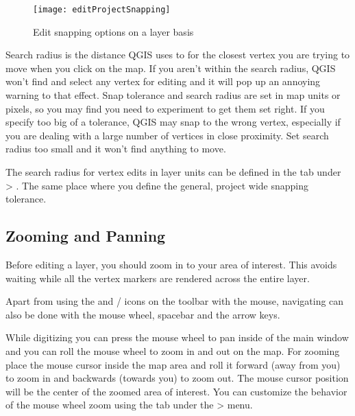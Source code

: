 \begin{figure}[H]
   \begin{center}
   \caption{Edit snapping options on a layer basis \nixcaption}\label{fig:snappingoptions}\smallskip
   \texttt{[image: editProjectSnapping]} 
\end{center}  
\end{figure}


Search radius is the distance QGIS uses to  for the closest
vertex you are trying to move when you click on the
map. If you aren't within the search radius, QGIS won't find and select
any vertex for editing and it will pop up an annoying warning to that effect.
Snap tolerance and search radius are set in map units or pixels, so you may find you
need to experiment to get them set right. If you specify too big of a
tolerance, QGIS may snap to the wrong vertex, especially if you are dealing
with a large number of vertices in close proximity. Set search radius too
small and it won't find anything to move.

The search radius for vertex edits in layer units can be defined in the
 tab under  >
. The same place where you define the
general, project wide snapping tolerance.

\subsection{Zooming and Panning}

Before editing a layer, you should zoom in to your area of interest. This
avoids waiting while all the vertex markers are rendered across the entire
layer.

Apart from using the  and
/
icons on the toolbar with the mouse, navigating can also be done with the
mouse wheel, spacebar and the arrow keys.


While digitizing you can press the mouse wheel to pan inside of the main
window and you can roll the mouse wheel to zoom in and out on the map. For
zooming place the mouse cursor inside the map area and roll it forward (away
from you)
to zoom in and backwards (towards you) to zoom out. The mouse cursor position
will
be the center of the zoomed area of interest. You can customize the behavior
of the mouse wheel zoom using the  tab under the
 > menu.

